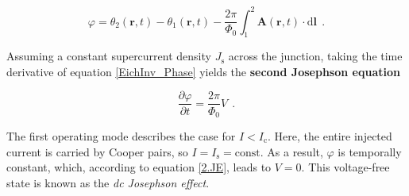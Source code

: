 \begin{equation}
\label{EichInv_Phase}
\varphi = \theta_2(\textbf{r},t) - \theta_1(\textbf{r},t) - \frac{2\pi}{\Phi_0}\int_{1}^{2}\textbf{A}(\textbf{r},t)\cdot \mathrm{d}\textbf{l} \ \ .
\end{equation}


Assuming a constant supercurrent density $J_\mathrm{s}$ across the junction, taking the time derivative of equation \eqref{EichInv_Phase} yields the \textbf{second Josephson equation} \cite{Josephson1965}

\begin{equation}
\label{2.JE}
\frac{\partial\varphi}{\partial t} = \frac{2\pi}{\Phi_0}V \ \ .
\end{equation}




The first operating mode describes the case for $I<I_\mathrm{c}$. Here, the entire injected current is carried by Cooper pairs, so $I=I_\mathrm{s}=\mathrm{const}$. As a result, $\varphi$ is temporally constant, which, according to equation \eqref{2.JE}, leads to $V=0$. This voltage-free state is known as the \textit{dc Josephson effect}.

